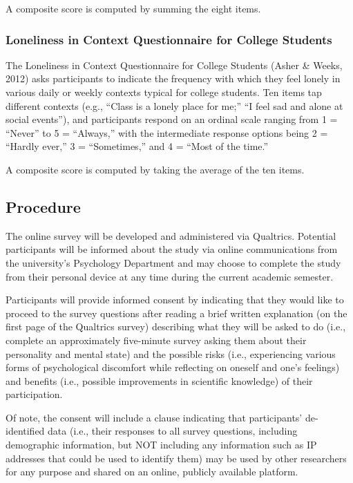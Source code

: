 \documentclass[
  english,
  man]{apa6}
\begin{document}
A composite score is computed by summing the eight items.

\subsubsection{Loneliness in Context Questionnaire for College Students}\label{loneliness-in-context-questionnaire-for-college-students}

The Loneliness in Context Questionnaire for College Students (Asher \& Weeks, 2012) asks participants to indicate the frequency with which they feel lonely in various daily or weekly contexts typical for college students. Ten items tap different contexts (e.g., ``Class is a lonely place for me;'' ``I feel sad and alone at social events''), and participants respond on an ordinal scale ranging from 1 = ``Never'' to 5 = ``Always,'' with the intermediate response options being 2 = ``Hardly ever,'' 3 = ``Sometimes,'' and 4 = ``Most of the time.''

A composite score is computed by taking the average of the ten items.

\subsection{Procedure}\label{procedure}

The online survey will be developed and administered via Qualtrics. Potential participants will be informed about the study via online communications from the university's Psychology Department and may choose to complete the study from their personal device at any time during the current academic semester.

Participants will provide informed consent by indicating that they would like to proceed to the survey questions after reading a brief written explanation (on the first page of the Qualtrics survey) describing what they will be asked to do (i.e., complete an approximately five-minute survey asking them about their personality and mental state) and the possible risks (i.e., experiencing various forms of psychological discomfort while reflecting on oneself and one's feelings) and benefits (i.e., possible improvements in scientific knowledge) of their participation.

Of note, the consent will include a clause indicating that participants' de-identified data (i.e., their responses to all survey questions, including demographic information, but NOT including any information such as IP addresses that could be used to identify them) may be used by other researchers for any purpose and shared on an online, publicly available platform.
\end{document}
